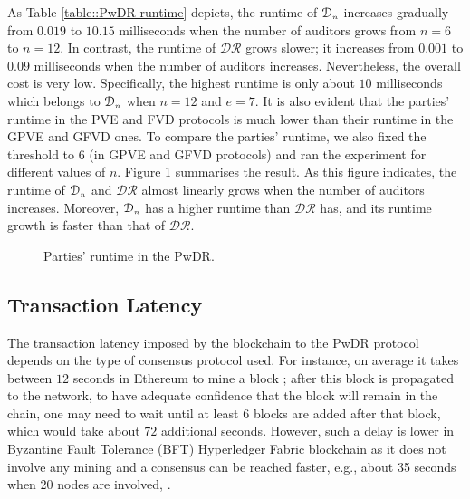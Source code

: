 As  Table \ref{table::PwDR-runtime} depicts, the runtime of $\mathcal{D}_{\scriptscriptstyle n}$    increases gradually from $0.019$ to $10.15$ milliseconds when the number of auditors grows from $n=6$ to $n=12$.  In contrast, the runtime of $\mathcal{DR}$ grows slower; it increases from  $0.001$ to $0.09$ milliseconds when the number of auditors increases. Nevertheless, the overall cost is very low. Specifically, the highest runtime is only about $10$ milliseconds which belongs to $\mathcal{D}_{\scriptscriptstyle n}$ when $n=12$ and $e=7$. It is also evident that the parties' runtime in the PVE and FVD protocols is much lower than their runtime in the GPVE and GFVD ones. To compare the parties' runtime, we also fixed the threshold to $6$ (in GPVE and GFVD protocols) and ran the experiment for different values of $n$. Figure  \ref{plot::runtime} summarises the result. As this figure indicates, the runtime of  $\mathcal{D}_{\scriptscriptstyle n}$ and $\mathcal{DR}$ almost linearly grows when the number of auditors increases. Moreover,   $\mathcal{D}_{\scriptscriptstyle n}$  has a higher runtime than $\mathcal{DR}$ has,   and its runtime growth is faster than that of $\mathcal{DR}$. 
%
\begin{figure}[!htb]
\centering
{}
\caption{\small Parties' runtime in the PwDR.}\label{plot::runtime}
\vspace{-2mm}
\end{figure}

\subsection{Transaction Latency}

The transaction latency imposed by the blockchain to the PwDR protocol depends on the type of consensus protocol used. For instance, on average it takes between  $12$ seconds in Ethereum to mine a block \cite{EyalGSR16}; after this block is propagated to the network, to have adequate confidence that the block will remain in the chain, one may need to wait until at least $6$ blocks are added after that block, which would take about $72$ additional seconds. However, such a delay is lower in Byzantine Fault Tolerance (BFT) Hyperledger Fabric blockchain as it does not involve any mining and a consensus can be reached faster, e.g., about 35 seconds when 20 nodes are involved, \cite{Hyperledger-Metrics}. 







